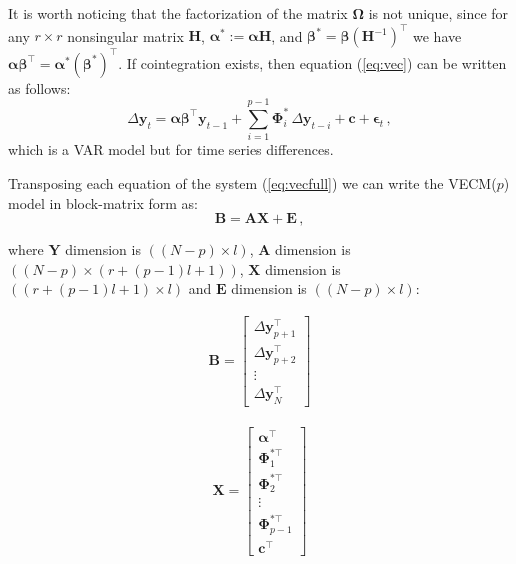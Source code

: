 It is worth noticing that the factorization of the matrix
$\boldsymbol\Omega$ is not unique, since for any $r \times r$
nonsingular matrix $\mathbf{H}$, $\boldsymbol{\alpha}^*:=\boldsymbol{\alpha}\mathbf{H}$,
and $\boldsymbol{\beta}^*=\boldsymbol{\beta}(\mathbf{H}^{-1})^\top$ we have
$\boldsymbol{\alpha\beta}^\top=\boldsymbol{\alpha}^*(\boldsymbol{\beta}^*)^\top$.
If cointegration exists, then equation (\ref{eq:vec}) can be written
as follows:
\begin{equation}\label{eq:vecfull}
\Delta\mathbf{y}_t 
= \boldsymbol{\alpha\beta}^\top\mathbf{y}_{t-1} 
  + \sum_{i=1}^{p-1}\boldsymbol{\Phi}_i^*\,\Delta\mathbf{y}_{t-i}
  + \mathbf{c} + \boldsymbol{\epsilon}_t\,,
\end{equation}
\noindent
which is a VAR model but for time series differences.


Transposing each equation of the system (\ref{eq:vecfull}) we can write
the VECM($p$) model in block-matrix form as:
\begin{equation}\label{eq:simpleveceq}
\mathbf{B} = 
\mathbf{A} \mathbf{X} + 
\mathbf{E} \, , 
\end{equation}

\noindent where $\mathbf{Y}$ dimension is $((N-p)\times l)$, $\mathbf{A}$
dimension is $((N-p)\times(r+(p-1)l +1))$, $\mathbf{X}$ dimension is $((r+(p-1)l
+1)\times l)$ and $\mathbf{E}$ dimension is $((N-p)\times l)$:

\begin{align}
\label{eq:vecY}
\mathbf{B}
= \begin{bmatrix}
   \Delta\mathbf{y}_{p+1}^\top \\
   \Delta\mathbf{y}_{p+2}^\top \\
   \vdots \\
   \Delta\mathbf{y}_N^\top
   \end{bmatrix}
\end{align}

\begin{align}
\label{eq:vecX}
\mathbf{X}
= \begin{bmatrix}
   \boldsymbol{\alpha}^\top \\
   \boldsymbol{\Phi}_1^{*\top} \\
   \boldsymbol{\Phi}_2^{*\top} \\
   \vdots \\
   \boldsymbol{\Phi}_{p-1}^{*\top} \\
   \mathbf{c}^\top
   \end{bmatrix}
\end{align}

